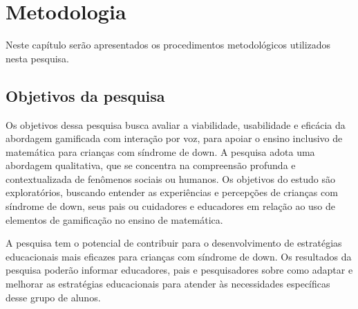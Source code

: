 

\chapter{Metodologia}\label{chp:met}

Neste capítulo serão apresentados os procedimentos metodológicos utilizados nesta pesquisa.

\section{Objetivos da pesquisa}
Os objetivos dessa pesquisa busca avaliar a viabilidade, usabilidade e eficácia da abordagem gamificada com interação por voz, para apoiar o ensino inclusivo de matemática para crianças com síndrome de down. A pesquisa adota uma abordagem qualitativa, que se concentra na compreensão profunda e contextualizada de fenômenos sociais ou humanos. Os objetivos do estudo são exploratórios, buscando entender as experiências e percepções de crianças com síndrome de down, seus pais ou cuidadores e educadores em relação ao uso de elementos de gamificação no ensino de matemática.

A pesquisa tem o potencial de contribuir para o desenvolvimento de estratégias educacionais mais eficazes para crianças com síndrome de down. Os resultados da pesquisa poderão informar educadores, pais e pesquisadores sobre como adaptar e melhorar as estratégias educacionais para atender às necessidades específicas desse grupo de alunos.

